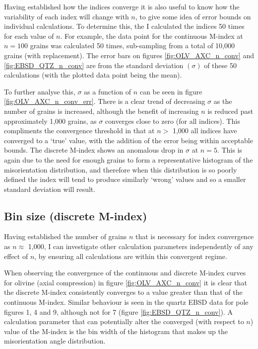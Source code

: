 \documentclass[a4paper,12pt,twoside]{report}
\numberwithin{equation}{chapter}
\begin{document}
Having established how the indices converge it is also useful to know how the variability of each index will change with $n$, to give some idea of error bounds on individual calculations. To determine this, the I calculated the indices 50 times for each value of $n$. For example, the data point for the continuous M-index at $n = 100$ grains was calculated 50 times, sub-sampling from a total of 10,000 grains (with replacement). The error bars on figures \ref{fig:OLV_AXC_n_conv} and \ref{fig:EBSD_QTZ_n_conv} are from the standard deviation $(\sigma)$ of these 50 calculations (with the plotted data point being the mean).

To further analyse this, $\sigma$ as a function of $n$ can be seen in figure \ref{fig:OLV_AXC_n_conv_err}. There is a clear trend of decreasing $\sigma$ as the number of grains is increased, although the benefit of increasing $n$ is reduced past approximately 1,000 grains, as $\sigma$ converges close to zero (for all indices). This compliments the convergence threshold in that at $n >$ 1,000 all indices have converged to a \lq{}true\rq{} value, with the addition of the error being within acceptable bounds. The discrete M-index shows an anomalous drop in $\sigma$ at $n = 5$. This is again due to the need for enough grains to form a representative histogram of the misorientation distribution, and therefore when this distribution is so poorly defined the index will tend to produce similarly \lq{}wrong\rq{} values and so a smaller standard deviation will result.

\subsection{Bin size (discrete M-index)} \label{sec:bin_size}

Having established the number of grains $n$ that is necessary for index convergence as $n \approx$ 1,000, I can investigate other calculation parameters independently of any effect of $n$, by ensuring all calculations are within this convergent regime. 

When observing the convergence of the continuous and discrete M-index curves for olivine (axial compression) in figure \ref{fig:OLV_AXC_n_conv} it is clear that the discrete M-index consistently converges to a value greater than that of the continuous M-index. Similar behaviour is seen in the quartz EBSD data for pole figures 1, 4 and 9, although not for 7 (figure \ref{fig:EBSD_QTZ_n_conv}). A calculation parameter that can potentially alter the converged (with respect to $n$) value of the M-index is the bin width of the histogram that makes up the misorientation angle distribution.   
\end{document}
